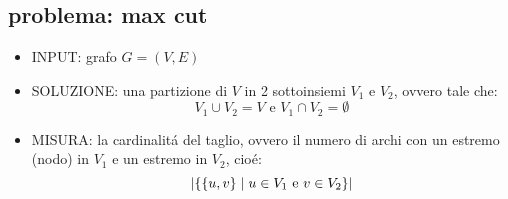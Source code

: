 
\subsection*{problema: max cut}
\begin{flushleft}
	\begin{itemize}
		\item INPUT: grafo $G=(V,E)$
		\item SOLUZIONE: una partizione di $V$ in 2 sottoinsiemi $V_1$ e $V_2$, ovvero tale che:
			$$V_1\cup V_2=V\text{ e }V_1\cap V_2=\emptyset$$
		\item MISURA: la cardinalit\'a del taglio, ovvero il numero di archi con un estremo (nodo) in $V_1$ e un estremo in $V_2$, cio\'e:
			$$\vert\{\{u,v\}\hspace{0.1cm}\vert\hspace{0.1cm}u\in V_1\text{ e }v\in V_2\}\vert$$
	\end{itemize}
\end{flushleft}


